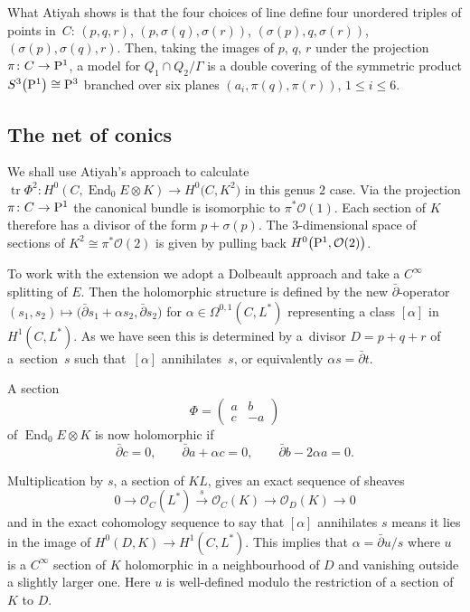 \documentclass[10pt,a4paper]{amsart}
\numberwithin{equation}{section}
\begin{document}
What Atiyah shows is that the four choices of line define four unordered triples of points in~$C$:
$(p,q,r)$, $(p,\sigma(q),\sigma(r))$, $(\sigma(p),q,\sigma(r))$, $(\sigma(p),\sigma(q),r)$. Then, taking the images of $p$, $q$, $r$ under the projection $\pi\colon C\rightarrow {\rm P}^1$, a model for $Q_1\cap Q_2/\Gamma$ is a double covering of the symmetric product $S^3\big({\rm P}^1\big)\cong {\rm P}^3$ branched over six planes $(a_i,\pi(q),\pi(r))$, $1\le i\le 6$.

\subsection{The net of conics}\label{net}
We shall use Atiyah's approach to calculate $\operatorname{tr}\Phi^2\colon H^0(C,\operatorname{End}_0E\otimes K) \rightarrow H^0\big(C,K^2\big)$ in this genus $2$ case. Via the projection $\pi\colon C\rightarrow {\rm P}^1$ the canonical bundle is isomorphic to $\pi^*\mathcal{O}(1)$. Each section of $K$ therefore has a divisor of the form $p+\sigma(p)$. The $3$-dimensional space of sections of $K^2\cong \pi^*\mathcal{O}(2)$ is given by pulling back $H^0\big({\rm P}^1,\mathcal{O}(2)\big)$.

To work with the extension we adopt a Dolbeault approach and take a $C^{\infty}$ splitting of $E$. Then
 the holomorphic structure is defined by the new $\bar\partial$-operator $(s_1,s_2)\mapsto \big(\bar\partial s_1+\alpha s_2, \bar\partial s_2\big)$
for $\alpha\in \Omega^{0,1}(C,L^*)$ representing a class $[\alpha]$ in $H^1(C,L^*)$. As we have seen this is determined by a~divisor $D=p+q+r$ of a~section~$s$ such that~$[\alpha]$ annihilates~$s$, or equivalently $\alpha s=\bar\partial t$.

A section
\[\Phi=\begin{pmatrix}a & b\\
c & -a\end{pmatrix}\] of $\operatorname{End}_0E\otimes K$ is now holomorphic if
\begin{equation}
\bar\partial c=0,\qquad \bar\partial a+\alpha c=0,\qquad \bar\partial b - 2\alpha a=0.
\label{holo}
\end{equation}

Multiplication by $s$, a section of $KL$, gives an exact sequence of sheaves
\begin{displaymath}0\rightarrow \mathcal{O}_C(L^*)\stackrel{s}\rightarrow \mathcal{O}_C(K)\rightarrow \mathcal{O}_D(K)\rightarrow 0\end{displaymath}
and in the exact cohomology sequence to say that $[\alpha]$ annihilates $s$ means it lies in the image of $H^0(D, K)\rightarrow H^1(C,L^*)$. This implies that
 $\alpha=\bar\partial u/s$ where $u$ is a $C^{\infty}$ section of $K$ holomorphic in a neighbourhood of $D$ and vanishing outside a slightly larger one. Here $u$ is well-defined modulo the restriction of a section of $K$ to $D$.
\end{document}
